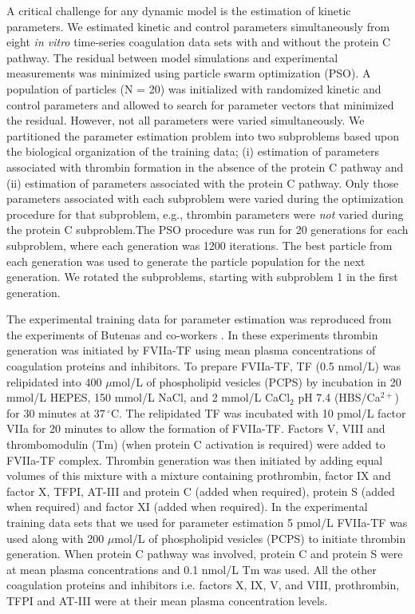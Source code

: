 \documentclass[processes,article,received,moreauthors,pdftex,12pt,a4paper]{mdpi}
\begin{document}
A critical challenge for any dynamic model is the estimation of kinetic parameters. 
We estimated kinetic and control parameters simultaneously from eight \emph{in vitro} time-series coagulation data sets with and without the protein C pathway. 
The residual between model simulations and experimental measurements was minimized using particle swarm optimization (PSO). 
A population of particles (N = 20) was initialized with randomized kinetic and control parameters and allowed to search for parameter vectors that minimized
the residual. However, not all parameters were varied simultaneously. 
We partitioned the parameter estimation problem into two subproblems based upon the biological organization of the training data; 
(i) estimation of parameters associated with thrombin formation in the absence of the protein C pathway and (ii) estimation of parameters associated with the protein C pathway.
Only those parameters associated with each subproblem were varied during the optimization procedure for that subproblem, e.g., thrombin parameters were \textit{not} varied during the protein C subproblem.The PSO procedure was run for 20 generations for each subproblem, where each generation was 1200 iterations. The best particle from each generation was used to generate the particle population for the next generation. We rotated the subproblems, starting with subproblem 1 in the first generation.

The experimental training data for parameter estimation was reproduced from the experiments of Butenas and co-workers \citep{Butenas:1999aa}. In these experiments thrombin generation was initiated by FVIIa-TF using mean plasma concentrations of coagulation proteins and inhibitors. To prepare FVIIa-TF, TF (0.5 nmol/L) was relipidated into 400 $\mu$mol/L of phospholipid vesicles (PCPS) by incubation in 20 mmol/L HEPES, 150 mmol/L NaCl, and 2 mmol/L CaCl$_{2}$ pH 7.4 (HBS/Ca$^{2+}$) for 30 minutes at $37\,^{\circ}\mathrm{C}$. The relipidated TF was incubated with 10 pmol/L factor VIIa for 20 minutes to allow the formation of FVIIa-TF.  Factors V, VIII and thrombomodulin (Tm) (when protein C activation is required) were added to FVIIa-TF complex. Thrombin generation was then initiated by adding equal volumes of this mixture with a mixture containing  prothrombin, factor IX and factor X, TFPI, AT-III and protein C (added when required), protein S (added when required) and factor XI (added when required). In the experimental training data sets that we used for parameter estimation 5 pmol/L FVIIa-TF was used along with 200 $\mu$mol/L of phospholipid vesicles (PCPS) to initiate thrombin generation. When protein C pathway was involved, protein C and protein S were at mean plasma concentrations and 0.1 nmol/L Tm was used. All the other coagulation proteins and inhibitors i.e. factors X, IX, V, and VIII, prothrombin, TFPI and AT-III were at their mean plasma concentration levels.
\end{document}
